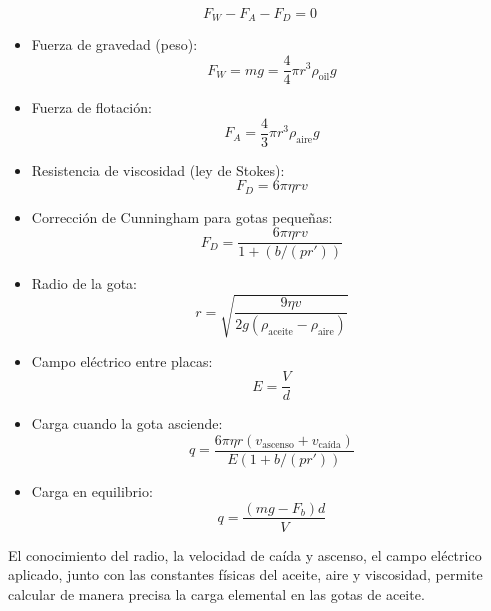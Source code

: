 \documentclass[
 reprint,
 amsmath,amssymb,
 aps,
]{revtex4-2}
\begin{document}
\begin{equation}
    F_W-F_A-F_D=0
\end{equation}
\begin{itemize}
    \item Fuerza de gravedad (peso):
    \begin{equation}
    F_W=mg=\frac{4}{4}\pi r^3\rho_\text{oil}g
    \end{equation}

    \item Fuerza de flotaci\'on:
    \begin{equation}
    F_A=\frac{4}{3}\pi r^3\rho_\text{aire}g
    \end{equation}

    \item Resistencia de viscosidad (ley de Stokes):
    \begin{equation}
    F_D = 6 \pi \eta r v
    \end{equation}

    \item Correcci\'on de Cunningham para gotas peque\~nas:
    \begin{equation}
    F_D = \frac{6 \pi \eta r v}{1 + (b/(p r'))}
    \end{equation}

    \item Radio de la gota:
    \begin{equation}
    r = \sqrt{\frac{9 \eta v}{2 g (\rho_{\text{aceite}} - \rho_{\text{aire}})}}
    \end{equation}

    \item Campo el\'ectrico entre placas:
    \begin{equation}
    E = \frac{V}{d}
    \end{equation}

    \item Carga cuando la gota asciende:
    \begin{equation}
    q = \frac{6 \pi \eta r (v_{\text{ascenso}} + v_{\text{ca\'ida}})}{E (1 + b/(p r'))}
    \end{equation}

    \item Carga en equilibrio:
    \begin{equation}
    q = \frac{(m g - F_b) d}{V}
    \end{equation}
\end{itemize}

El conocimiento del radio, la velocidad de ca\'ida y ascenso, el campo el\'ectrico aplicado, junto con las constantes f\'isicas del aceite, aire y viscosidad, permite calcular de manera precisa la carga elemental en las gotas de aceite.
\end{document}

